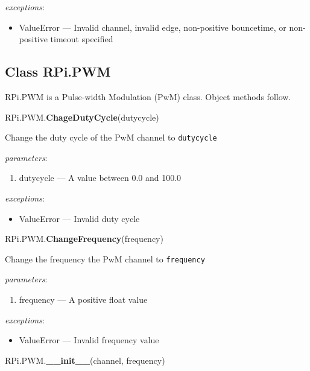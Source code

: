 \documentclass[12pt]{article}
\begin{document}
 
\textit{exceptions}:
\begin{itemize}
    \item ValueError --- Invalid channel, invalid edge, non-positive bouncetime, or  non-positive timeout specified
\end{itemize}

\subsection{Class RPi.PWM}
    
RPi.PWM is a Pulse-width Modulation (PwM) class. Object methods follow.

\medskip \medskip

\noindent RPi.PWM.\textbf{ChageDutyCycle}(dutycycle)
        
Change the duty cycle of the PwM channel to \texttt{dutycycle}
        
\textit{parameters}:
\begin{enumerate}      
        \item dutycycle --- A value between 0.0 and 100.0
\end{enumerate}
 
 
\textit{exceptions}:
\begin{itemize}
    \item ValueError --- Invalid duty cycle
\end{itemize}

\noindent RPi.PWM.\textbf{ChangeFrequency}(frequency)
        
Change the frequency the PwM channel to \texttt{frequency}
        
\textit{parameters}:
\begin{enumerate}      
        \item frequency --- A positive float value
\end{enumerate}
 
 
\textit{exceptions}:
\begin{itemize}
    \item ValueError --- Invalid frequency value
\end{itemize}

\noindent RPi.PWM.\textbf{\_\_init\_\_}(channel, frequency)
        
\end{document}
